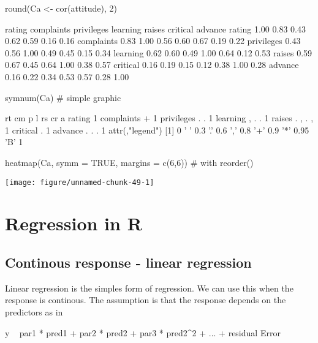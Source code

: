 \documentclass[a4paper,twoside]{tufte-book}\usepackage[]{graphicx}\usepackage[]{color}
\makeatletter
\def\maxwidth{ %
	\ifdim\Gin@nat@width>\linewidth
	\linewidth
	\else
	\Gin@nat@width
	\fi
}
\makeatother
\begin{document}
\begin{Anhang}
\begin{Schunk}
\begin{Sinput}
round(Ca <- cor(attitude), 2)
\end{Sinput}
\begin{Soutput}
           rating complaints privileges learning raises critical advance
rating       1.00       0.83       0.43     0.62   0.59     0.16    0.16
complaints   0.83       1.00       0.56     0.60   0.67     0.19    0.22
privileges   0.43       0.56       1.00     0.49   0.45     0.15    0.34
learning     0.62       0.60       0.49     1.00   0.64     0.12    0.53
raises       0.59       0.67       0.45     0.64   1.00     0.38    0.57
critical     0.16       0.19       0.15     0.12   0.38     1.00    0.28
advance      0.16       0.22       0.34     0.53   0.57     0.28    1.00
\end{Soutput}
\begin{Sinput}
symnum(Ca) # simple graphic
\end{Sinput}
\begin{Soutput}
           rt cm p l rs cr a
rating     1                
complaints +  1             
privileges .  .  1          
learning   ,  .  . 1        
raises     .  ,  . , 1      
critical             .  1   
advance          . . .     1
attr(,"legend")
[1] 0 ' ' 0.3 '.' 0.6 ',' 0.8 '+' 0.9 '*' 0.95 'B' 1
\end{Soutput}
\begin{Sinput}
heatmap(Ca, symm = TRUE, margins = c(6,6)) # with reorder()
\end{Sinput}


{\centering \texttt{[image: figure/unnamed-chunk-49-1]} 

}

\end{Schunk}

\chapter{Regression in R}


\section{Continous response - linear regression}

Linear regression is the simples form of regression. We can use this when the response is continous. The assumption is that the response depends on the predictors as in 

\begin{Schunk}
\begin{Sinput}
y ~ par1 * pred1 +  par2 * pred2 +  par3 * pred2^2 + ... + residual Error
\end{Sinput}
\end{Schunk}


\end{Anhang}
\end{document}
